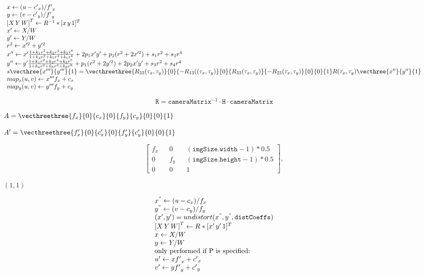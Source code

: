 \documentclass{article}
\begin{document}
\[ \begin{array}{l} x \leftarrow (u - {c'}_x)/{f'}_x \\ y \leftarrow (v - {c'}_y)/{f'}_y \\ {[X\,Y\,W]} ^T \leftarrow R^{-1}*[x \, y \, 1]^T \\ x' \leftarrow X/W \\ y' \leftarrow Y/W \\ r^2 \leftarrow x'^2 + y'^2 \\ x'' \leftarrow x' \frac{1 + k_1 r^2 + k_2 r^4 + k_3 r^6}{1 + k_4 r^2 + k_5 r^4 + k_6 r^6} + 2p_1 x' y' + p_2(r^2 + 2 x'^2) + s_1 r^2 + s_2 r^4\\ y'' \leftarrow y' \frac{1 + k_1 r^2 + k_2 r^4 + k_3 r^6}{1 + k_4 r^2 + k_5 r^4 + k_6 r^6} + p_1 (r^2 + 2 y'^2) + 2 p_2 x' y' + s_3 r^2 + s_4 r^4 \\ s\vecthree{x'''}{y'''}{1} = \vecthreethree{R_{33}(\tau_x, \tau_y)}{0}{-R_{13}((\tau_x, \tau_y)} {0}{R_{33}(\tau_x, \tau_y)}{-R_{23}(\tau_x, \tau_y)} {0}{0}{1} R(\tau_x, \tau_y) \vecthree{x''}{y''}{1}\\ map_x(u,v) \leftarrow x''' f_x + c_x \\ map_y(u,v) \leftarrow y''' f_y + c_y \end{array} \]
\pagebreak

\[\texttt{R} = \texttt{cameraMatrix} ^{-1} \cdot \texttt{H} \cdot \texttt{cameraMatrix}\]
\pagebreak

$A=\vecthreethree{f_x}{0}{c_x}{0}{f_y}{c_y}{0}{0}{1}$
\pagebreak

$A'=\vecthreethree{f_x'}{0}{c_x'}{0}{f_y'}{c_y'}{0}{0}{1}$
\pagebreak

\[\begin{bmatrix} f_x && 0 && ( \texttt{imgSize.width} -1)*0.5 \\ 0 && f_y && ( \texttt{imgSize.height} -1)*0.5 \\ 0 && 0 && 1 \end{bmatrix} ,\]
\pagebreak

$(1,1)$
\pagebreak

\[ \begin{array}{l} x^{"} \leftarrow (u - c_x)/f_x \\ y^{"} \leftarrow (v - c_y)/f_y \\ (x',y') = undistort(x^{"},y^{"}, \texttt{distCoeffs}) \\ {[X\,Y\,W]} ^T \leftarrow R*[x' \, y' \, 1]^T \\ x \leftarrow X/W \\ y \leftarrow Y/W \\ \text{only performed if P is specified:} \\ u' \leftarrow x {f'}_x + {c'}_x \\ v' \leftarrow y {f'}_y + {c'}_y \end{array} \]
\pagebreak
\end{document}
